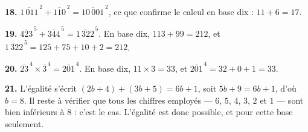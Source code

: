 \begin{corrige}
\textbf{18.} $\overline{1\,011}^{\,2}+\overline{110}^{\,2}
= \overline{10\,001}^{\,2}$, ce que confirme le calcul en base dix :
$11+6 = 17$.

\textbf{19.} $\overline{423}^{\,5}+\overline{344}^{\,5}
= \overline{1\,322}^{\,5}$. En base dix, $113+99 = 212$, et
$\overline{1\,322}^{\,5} = 125+75+10+2 = 212$.

\textbf{20.} $\overline{23}^{\,4}\times\overline{3}^{\,4}
= \overline{201}^{\,4}$. En base dix, $11\times3 = 33$, et
$\overline{201}^{\,4} = 32+0+1 = 33$.

\textbf{21.} L'égalité s'écrit $(2b+4)+(3b+5) = 6b+1$, soit $5b+9 = 6b+1$,
d'où $b = 8$. Il reste à vérifier que tous les chiffres employés — $6$, $5$,
$4$, $3$, $2$ et $1$ — sont bien inférieurs à $8$ : c'est le cas. L'égalité
est donc possible, et pour cette base seulement.
\end{corrige}

